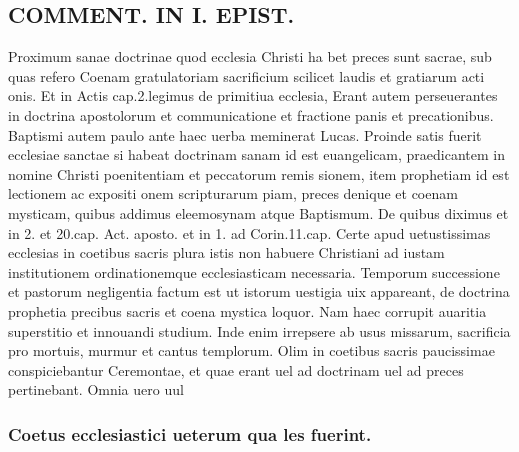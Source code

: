 \documentclass{article}
\begin{document}
\begin{pages}
\section*{COMMENT. IN I. EPIST. }\pstart Proximum sanae doctrinae quod ecclesia Christi ha bet preces sunt sacrae, sub quas refero Coenam gratulatoriam sacrificium scilicet laudis et gratiarum acti onis. Et in Actis cap.2.legimus de primitiua ecclesia, Erant autem perseuerantes in doctrina apostolorum et communicatione et fractione panis et precationibus. Baptismi autem paulo ante haec uerba meminerat Lucas. Proinde satis fuerit ecclesiae sanctae si habeat doctrinam sanam id est euangelicam, praedicantem in nomine Christi poenitentiam et peccatorum remis sionem, item prophetiam id est lectionem ac expositi onem scripturarum piam, preces denique et coenam mysticam, quibus addimus eleemosynam atque Baptismum. De quibus diximus et in 2. et 20.cap. Act. aposto. et in 1. ad Corin.11.cap. Certe apud uetustissimas ecclesias in coetibus sacris plura istis non habuere Christiani ad iustam institutionem ordinationemque ecclesiasticam necessaria. Temporum successione et pastorum negligentia factum est ut istorum uestigia uix appareant, de doctrina prophetia precibus sacris et coena mystica loquor. Nam haec corrupit auaritia superstitio et innouandi studium. Inde enim irrepsere ab usus missarum, sacrificia pro mortuis, murmur et cantus templorum. Olim in coetibus sacris paucissimae conspiciebantur Ceremontae, et quae erant uel ad doctrinam uel ad preces pertinebant. Omnia uero uul\pend
\subsubsection*{Coetus ecclesiastici ueterum qua les fuerint. }

\end{pages}
\end{document}
